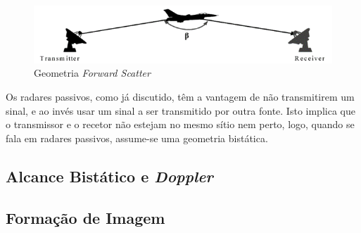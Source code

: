 \begin{figure}[h]
\centering
\includegraphics[scale=0.7]{chapters/ch2/assets/fsc}
\caption[Geometria \textit{Forward Scatter}]{Geometria \textit{Forward Scatter}}
\label{fig:fsc}
\end{figure}

Os radares passivos, como já discutido, têm a vantagem de não transmitirem um sinal, e ao invés usar um sinal a ser transmitido por outra fonte. Isto implica que o transmissor e o recetor não estejam no mesmo sítio nem perto, logo, quando se fala em radares passivos, assume-se uma geometria bistática.



\subsection{Alcance Bistático e \textit{Doppler}}


\subsection{Formação de Imagem}

